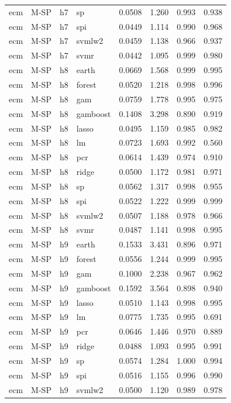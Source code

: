 \begin{ThreePartTable}
\begin{longtable}[t]{llclcccc}
ecm & M-SP & h7 & sp & 0.0508 & 1.260 & 0.993 & 0.938\\
ecm & M-SP & h7 & spi & 0.0449 & 1.114 & 0.990 & 0.968\\
ecm & M-SP & h7 & svmlw2 & 0.0459 & 1.138 & 0.966 & 0.937\\
ecm & M-SP & h7 & svmr & 0.0442 & 1.095 & 0.999 & 0.980\\
\addlinespace
ecm & M-SP & h8 & earth & 0.0669 & 1.568 & 0.999 & 0.995\\
ecm & M-SP & h8 & forest & 0.0520 & 1.218 & 0.998 & 0.996\\
ecm & M-SP & h8 & gam & 0.0759 & 1.778 & 0.995 & 0.975\\
ecm & M-SP & h8 & gamboost & 0.1408 & 3.298 & 0.890 & 0.919\\
ecm & M-SP & h8 & lasso & 0.0495 & 1.159 & 0.985 & 0.982\\
ecm & M-SP & h8 & lm & 0.0723 & 1.693 & 0.992 & 0.560\\
ecm & M-SP & h8 & pcr & 0.0614 & 1.439 & 0.974 & 0.910\\
ecm & M-SP & h8 & ridge & 0.0500 & 1.172 & 0.981 & 0.971\\
ecm & M-SP & h8 & sp & 0.0562 & 1.317 & 0.998 & 0.955\\
ecm & M-SP & h8 & spi & 0.0522 & 1.222 & 0.999 & 0.999\\
ecm & M-SP & h8 & svmlw2 & 0.0507 & 1.188 & 0.978 & 0.966\\
ecm & M-SP & h8 & svmr & 0.0487 & 1.141 & 0.998 & 0.995\\
\addlinespace
ecm & M-SP & h9 & earth & 0.1533 & 3.431 & 0.896 & 0.971\\
ecm & M-SP & h9 & forest & 0.0556 & 1.244 & 0.999 & 0.995\\
ecm & M-SP & h9 & gam & 0.1000 & 2.238 & 0.967 & 0.962\\
ecm & M-SP & h9 & gamboost & 0.1592 & 3.564 & 0.898 & 0.940\\
ecm & M-SP & h9 & lasso & 0.0510 & 1.143 & 0.998 & 0.995\\
ecm & M-SP & h9 & lm & 0.0775 & 1.735 & 0.995 & 0.691\\
ecm & M-SP & h9 & pcr & 0.0646 & 1.446 & 0.970 & 0.889\\
ecm & M-SP & h9 & ridge & 0.0488 & 1.093 & 0.995 & 0.991\\
ecm & M-SP & h9 & sp & 0.0574 & 1.284 & 1.000 & 0.994\\
ecm & M-SP & h9 & spi & 0.0516 & 1.155 & 0.996 & 0.990\\
ecm & M-SP & h9 & svmlw2 & 0.0500 & 1.120 & 0.989 & 0.978\\

\end{longtable}
\end{ThreePartTable}
